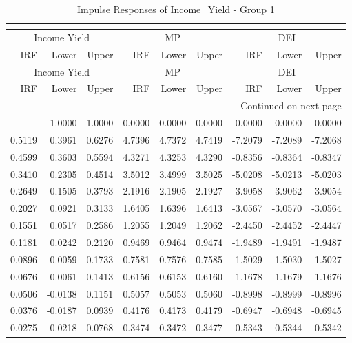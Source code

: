 \begin{longtable}{rrrrrrrrr}
\caption{Impulse Responses of Income_Yield - Group 1}\\
\label{tab:iy_irf_group1}\\
\toprule
\multicolumn{3}{c}{Income Yield} & \multicolumn{3}{c}{MP} & \multicolumn{3}{c}{DEI} \\
IRF & Lower & Upper & IRF & Lower & Upper & IRF & Lower & Upper \\
\midrule
\endfirsthead
\toprule
\multicolumn{3}{c}{Income Yield} & \multicolumn{3}{c}{MP} & \multicolumn{3}{c}{DEI} \\
IRF & Lower & Upper & IRF & Lower & Upper & IRF & Lower & Upper \\
\midrule
\endhead
\midrule
\multicolumn{9}{r}{Continued on next page} \\
\midrule
\endfoot
\bottomrule
\endlastfoot
1.0000 & 1.0000 & 1.0000 & 0.0000 & 0.0000 & 0.0000 & 0.0000 & 0.0000 & 0.0000 \\
0.5119 & 0.3961 & 0.6276 & 4.7396 & 4.7372 & 4.7419 & -7.2079 & -7.2089 & -7.2068 \\
0.4599 & 0.3603 & 0.5594 & 4.3271 & 4.3253 & 4.3290 & -0.8356 & -0.8364 & -0.8347 \\
0.3410 & 0.2305 & 0.4514 & 3.5012 & 3.4999 & 3.5025 & -5.0208 & -5.0213 & -5.0203 \\
0.2649 & 0.1505 & 0.3793 & 2.1916 & 2.1905 & 2.1927 & -3.9058 & -3.9062 & -3.9054 \\
0.2027 & 0.0921 & 0.3133 & 1.6405 & 1.6396 & 1.6413 & -3.0567 & -3.0570 & -3.0564 \\
0.1551 & 0.0517 & 0.2586 & 1.2055 & 1.2049 & 1.2062 & -2.4450 & -2.4452 & -2.4447 \\
0.1181 & 0.0242 & 0.2120 & 0.9469 & 0.9464 & 0.9474 & -1.9489 & -1.9491 & -1.9487 \\
0.0896 & 0.0059 & 0.1733 & 0.7581 & 0.7576 & 0.7585 & -1.5029 & -1.5030 & -1.5027 \\
0.0676 & -0.0061 & 0.1413 & 0.6156 & 0.6153 & 0.6160 & -1.1678 & -1.1679 & -1.1676 \\
0.0506 & -0.0138 & 0.1151 & 0.5057 & 0.5053 & 0.5060 & -0.8998 & -0.8999 & -0.8996 \\
0.0376 & -0.0187 & 0.0939 & 0.4176 & 0.4173 & 0.4179 & -0.6947 & -0.6948 & -0.6945 \\
0.0275 & -0.0218 & 0.0768 & 0.3474 & 0.3472 & 0.3477 & -0.5343 & -0.5344 & -0.5342 \\
\end{longtable}